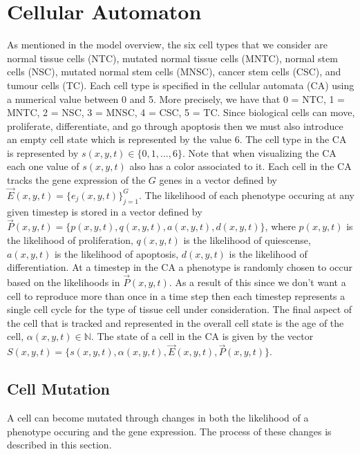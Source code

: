 \documentclass[\main/thesis.tex]{subfiles}
\begin{document}
\section{Cellular Automaton}

As mentioned in the model overview, the six cell types that we consider are 
normal tissue cells (NTC), mutated normal tissue cells (MNTC), normal stem cells 
(NSC), mutated normal stem cells (MNSC), cancer stem cells (CSC), and tumour 
cells (TC). Each cell type is specified in the cellular automata (CA) using a 
numerical value between 0 and 5. More precisely, we have that 0 {=} NTC, 
1 {=} MNTC, 2 {=} NSC, 3 {=} MNSC, 4 {=} CSC, 5 {=} TC.
Since biological cells can move, proliferate, differentiate, and go through 
apoptosis then we must also introduce an empty cell state which is represented 
by the value 6. The cell type in the CA is represented by 
$s(x, y, t) {\in} \{ 0, 1, ..., 6  \}$. Note that when visualizing the CA each 
one value of $s(x, y, t)$ also has a color associated to it.
Each cell in the CA tracks the gene expression of the $G$ genes in a vector 
defined by $\vec{E}(x, y, t) {=} \{ e_j(x, y, t) \}_{j{=}1}^{G}$. The likelihood 
of each phenotype occuring at any given timestep is stored in a vector defined 
by $\vec{P}(x, y, t) {=} \{ p(x, y, t), q(x, y, t), a(x, y, t), d(x, y, t) \}$, 
where $p(x, y, t)$ is the likelihood of proliferation, $q(x, y, t)$ is 
the likelihood of quiescense, $a(x, y, t)$ is the likelihood of 
apoptosis, $d(x, y, t)$ is the likelihood of differentiation. At a timestep in 
the CA a phenotype is randomly chosen to occur based on the likelihoods in 
$\vec{P}(x, y, t)$. As a result of this since we don't want a cell to reproduce 
more than once in a time step then each timestep represents a single cell cycle 
for the type of tissue cell under consideration. The final aspect of the cell 
that is tracked and represented in the overall cell state is the age of the 
cell, $\alpha(x, y, t) {\in} \mathbb{N}$. The state of a cell in the CA is given 
by the vector $S(x, y, t) {=} \{ s(x, y, t), \alpha(x, y, t), \vec{E}(x, y, t), 
\vec{P}(x, y, t) \}$.

\newpage
\subsection{Cell Mutation}

A cell can become mutated through changes in both the likelihood of a phenotype 
occuring and the gene expression. The process of these changes is described in 
this section.
\end{document}
